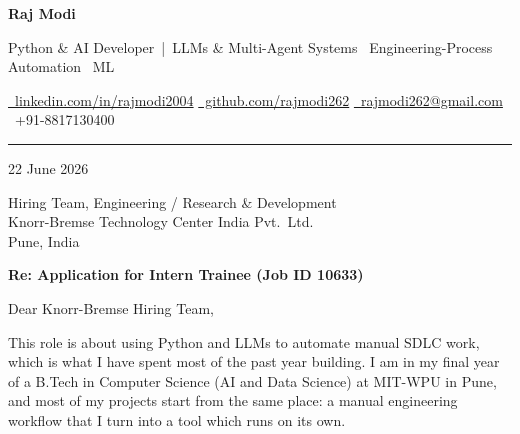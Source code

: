 \documentclass[a4paper,11pt]{article}
\begin{document}
\begin{center}
  {\fontsize{24}{28}\selectfont\bfseries\color{HeaderDark}Raj Modi}

  \vspace{2pt}
  {\small\color{MidGray}Python \& AI Developer \,|\, LLMs \& Multi-Agent Systems \textperiodcentered\ Engineering-Process Automation \textperiodcentered\ ML}

  \vspace{3pt}
  {\small%
    \href{https://www.linkedin.com/in/rajmodi2004/}{{\color{AccentBlue}\faLinkedin}~\color{LinkBlue}linkedin.com/in/rajmodi2004}%
    \quad{\color{LightGray}|}%
    \quad\href{https://github.com/rajmodi262}{{\color{AccentBlue}\faGithub}~\color{LinkBlue}github.com/rajmodi262}%
    \quad{\color{LightGray}|}%
    \quad\href{mailto:rajmodi262@gmail.com}{{\color{AccentBlue}\faEnvelope}~\color{LinkBlue}rajmodi262@gmail.com}%
    \quad{\color{LightGray}|}%
    \quad{\color{AccentBlue}\faPhone*}~{\color{DarkGray}+91-8817130400}%
  }
\end{center}

\vspace{-4pt}
{\color{SectionLine}\rule{\textwidth}{1pt}}

\vspace{2pt}

{\small\color{SubText}22 June 2026}

\vspace{-2pt}
{\small\color{DarkGray}%
Hiring Team, Engineering / Research \& Development\\
Knorr-Bremse Technology Center India Pvt.\ Ltd.\\
Pune, India}

\vspace{2pt}
{\color{HeaderDark}\textbf{Re: Application for Intern Trainee (Job ID 10633)}}

\vspace{2pt}
Dear Knorr-Bremse Hiring Team,

This role is about using Python and LLMs to automate manual SDLC work, which is what I have spent
most of the past year building. I am in my final year of a B.Tech in Computer Science (AI and Data
Science) at MIT-WPU in Pune, and most of my projects start from the same place: a manual engineering
workflow that I turn into a tool which runs on its own.
\end{document}
